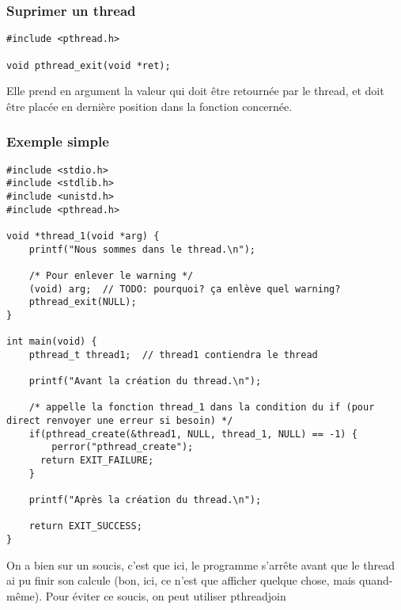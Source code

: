 \documentclass[a4paper]{article}
\begin{document}
\subsubsection{Suprimer un thread}
\begin{lstlisting}
#include <pthread.h>

void pthread_exit(void *ret);
\end{lstlisting}
Elle prend en argument la valeur qui doit être retournée par le thread, et doit être placée en dernière position dans la fonction concernée.
\newpage
\subsubsection{Exemple simple}
\begin{lstlisting}
#include <stdio.h>
#include <stdlib.h>
#include <unistd.h>
#include <pthread.h>

void *thread_1(void *arg) {
    printf("Nous sommes dans le thread.\n");

    /* Pour enlever le warning */
    (void) arg;  // TODO: pourquoi? ça enlève quel warning?
    pthread_exit(NULL);
}

int main(void) {
    pthread_t thread1;  // thread1 contiendra le thread

    printf("Avant la création du thread.\n");

    /* appelle la fonction thread_1 dans la condition du if (pour direct renvoyer une erreur si besoin) */
    if(pthread_create(&thread1, NULL, thread_1, NULL) == -1) {
	    perror("pthread_create");
      return EXIT_FAILURE;
    }

    printf("Après la création du thread.\n");

    return EXIT_SUCCESS;
}
\end{lstlisting}
On a bien sur un soucis, c'est que ici, le programme s'arrête avant que le thread ai pu finir son calcule (bon, ici, ce n'est que afficher quelque chose, mais quand-même). Pour éviter ce soucis, on peut utiliser \guillemotleft{} pthread\textunderscore{}join \guillemotright{}
\end{document}
